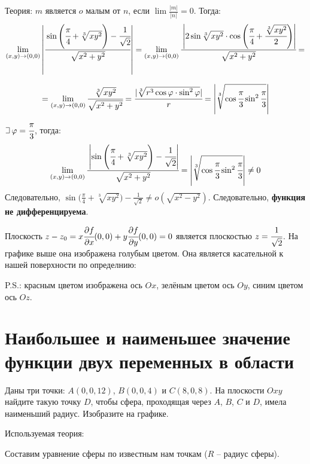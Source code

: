 \documentclass[12pt]{report}
\def\letus{%
    \mathord{\setbox0=\hbox{$\exists$}%
             \hbox{\kern 0.125\wd0%
                   \vbox to \ht0{%
                      \hrule width 0.75\wd0%
                      \vfill%
                      \hrule width 0.75\wd0}%
                   \vrule height \ht0%
                   \kern 0.125\wd0}%
           }%
}
\begin{document}
Теория: $m$ является $o$ малым от $n$, если $\lim \frac{|m|}{|n|}=0$. Тогда:
$$ \lim_{(x,y)\to(0,0)}\left|\cfrac{\sin\Bigg(\cfrac{\pi}{4}+\sqrt[3]{xy^2}\Bigg)-\cfrac{1}{\sqrt{2}}}{\sqrt{x^2+y^2}}\right|=\lim_{(x,y)\to(0,0)}\cfrac{\left|2\sin\sqrt[3]{xy^2}\cdot\cos\Bigg(\cfrac{\pi}{4}+\cfrac{\sqrt[3]{xy^2}}{2}\Bigg)\right|}{\sqrt{x^2+y^2}}=$$

$$=\lim_{(x,y)\to(0,0)}\cfrac{\sqrt[3]{xy^2}}{\sqrt{x^2+y^2}}=\cfrac{|\sqrt[3]{r^3\cos\varphi\cdot\sin^2\varphi}|}{r}=\left|\sqrt[3]{\cos\cfrac{\pi}{3}\sin^2\cfrac{\pi}{3}}\right|  $$
$\letus\,\varphi=\cfrac{\pi}{3}$, тогда:
$$ \lim_{(x,y)\to(0,0)}\cfrac{\left|\sin\Bigg(\cfrac{\pi}{4}+\sqrt[3]{xy^2}\Bigg)-\cfrac{1}{\sqrt{2}}\right|}{\sqrt{x^2+y^2}}=\left|\sqrt[3]{\cos\cfrac{\pi}{3}\sin^2\cfrac{\pi}{3}}\right|\neq 0 $$
Следовательно, $\sin\Big(\frac{\pi}{4}+\sqrt[3]{xy^2}\Big)-\frac{1}{\sqrt{2}}\ne o(\sqrt{x^2-y^2})$. Следовательно, \textbf{функция не дифференцируема}.

Плоскость $z-z_0=x\cfrac{\partial f}{\partial x}(0,0)+y\cfrac{\partial f}{\partial y}(0,0)=0$ является плоскостью $z=\cfrac{1}{\sqrt{2}}$. На графике выше она изображена голубым цветом. Она является касательной к нашей поверхности по определнию:

\begin{center}
\end{center}

P.S.: красным цветом изображена ось $Ox$, зелёным цветом ось $Oy$, синим цветом ось $Oz$.
\chapter{Наибольшее и наименьшее значение функции двух
переменных в области}
Даны три точки: $A(0,0,12)$, $B(0,0,4)$ и $C(8,0,8)$. На плоскости $Oxy$ найдите такую точку $D$, чтобы сфера, проходящая через $A$, $B$, $C$ и $D$, имела наименьший радиус. Изобразите на графике.

Используемая теория:
\begin{center}
\end{center}
\newpage
Составим уравнение сферы по известным нам точкам ($R$ -- радиус сферы).
\end{document}
